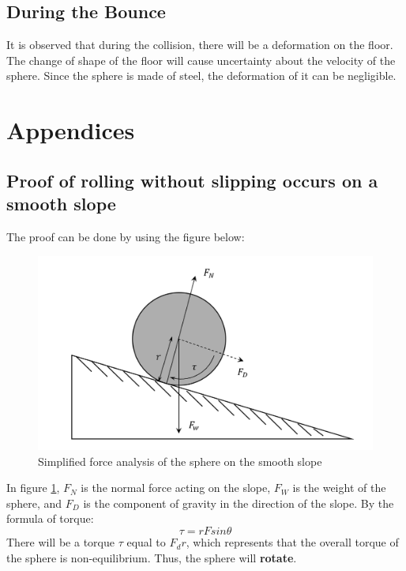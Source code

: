 \documentclass{article}
\begin{document}
    \subsection{During the Bounce}
         It is observed that during the collision, there will be a deformation on the floor. The change of shape of the floor will cause uncertainty about the velocity of the sphere. Since the sphere is made of steel, the deformation of it can be negligible. 
\newpage
\appendix
\section{Appendices}
    \subsection{Proof of rolling without slipping occurs on a smooth slope} \label{proofofslide}
        The proof can be done by using the figure below:
        \begin{figure}[H]
            \centering
            \includegraphics[width=0.5\linewidth]{no_friction.png}
            \caption{Simplified force analysis of the sphere on the smooth slope}
            \label{frictionless}
        \end{figure}
        In figure \ref{frictionless}, $F_N$ is the normal force acting on the slope, $F_W$ is the weight of the sphere, and $F_D$ is the component of gravity in the direction of the slope.
        By the formula of torque:
        \begin{equation}
            \tau = rFsin\theta
        \end{equation}
        There will be a torque $\tau$ equal to $F_dr$, which represents that the overall torque of the sphere is non-equilibrium. Thus, the sphere will \textbf{rotate}.
\end{document}
